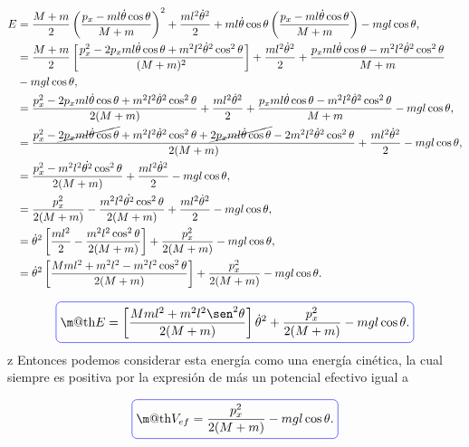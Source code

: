 \documentclass[a4paper,10pt]{article}
\makeatletter
\numberwithin{equation}{section}
\newcommand*{\boxcolor}{blue}
\renewcommand{\boxed}[1]{\textcolor{\boxcolor}{%
\tikz[baseline={([yshift=-1ex]current bounding box.center)}] \node [rectangle, minimum width=1ex,rounded corners,draw] {\normalcolor\m@th$\displaystyle#1$};}}
\makeatother
\begin{document}
\begin{align*}
 E &= \frac{M+m}{2}\left(\frac{p_x - ml\dot{\theta}\cos{\theta}}{M+m}\right)^2 + 
 \frac{ml^2 \dot{\theta}^2}{2} + ml\dot{\theta}\cos{\theta}\left(\frac{p_x - ml\dot{\theta}\cos{\theta}}{M+m}\right)
 - mgl\cos{\theta}, \\
   &= \frac{M+m}{2}\left[ \frac{p_x^2 - 2 p_x ml \dot{\theta}\cos{\theta}+ m^2l^2 \dot{\theta}^2 \cos^2{\theta}}{(M+m)^2} \right]
   + \frac{ml^2 \dot{\theta}^2}{2} + \frac{p_xml\dot{\theta}\cos{\theta - m^2l^2\dot{\theta}^2\cos^2{\theta}}}{M+m} \\
   &- mgl\cos{\theta}, \\
 &= \frac{p_x^2 - 2 p_x ml \dot{\theta}\cos{\theta}+ m^2 l^2 \dot{\theta}^2 \cos^2{\theta}}{2(M+m)}
 + \frac{ml^2 \dot{\theta}^2}{2} + \frac{p_xml\dot{\theta}\cos{\theta} - m^2l^2\dot{\theta}^2\cos^2{\theta}}{M+m}
   - mgl\cos{\theta}, \\
 &= \frac{p_x^2 - \cancel{ 2 p_x ml \dot{\theta}\cos{\theta}}+ m^2 l^2 \dot{\theta}^2 \cos^2{\theta} 
 + \cancel{2p_xml\dot{\theta}\cos{\theta}} -2 m^2l^2\dot{\theta}^2\cos^2{\theta}}{2(M+m)}
  + \frac{ml^2 \dot{\theta}^2}{2} - mgl\cos{\theta}, \\
 &= \frac{p_x^2 - m^2 l^2 \dot{\theta^2} \cos^2{\theta}}{2(M+m)}  + \frac{ml^2 \dot{\theta}^2}{2} - mgl\cos{\theta}, \\
 &= \frac{p_x^2}{2(M+m)} - \frac{ m^2 l^2 \dot{\theta^2} \cos^2{\theta}}{2(M+m)} + \frac{ml^2 \dot{\theta}^2}{2} 
 - mgl\cos{\theta}, \\
 &= \dot{\theta}^2 \left[\frac{ml^2}{2} -  \frac{ m^2 l^2 \cos^2{\theta}}{2(M+m)}\right] 
 + \frac{p_x^2}{2(M+m)} - mgl\cos{\theta},  \\
 &= \dot{\theta}^2\left[ \frac{Mml^2 + m^2 l^2 - m^2l^2\cos^2{\theta}}{2(M+m)} \right]
 + \frac{p_x^2}{2(M+m)} - mgl\cos{\theta}.
\end{align*}

\begin{equation}
 \boxed{E = \left[\frac{Mml^2 + m^2l^2\sen^2{\theta}}{2(M+m)} \right]\dot{\theta}^2 + \frac{p_x^2}{2(M+m)} - mgl\cos{\theta}.}
\label{eq:pendu12}
\end{equation}
z
Entonces podemos considerar esta energía como una energía cinética, la cual siempre 
es positiva por la expresión de  más un potencial efectivo igual a 

\begin{equation}
 \boxed{V_{ef} = \frac{p_x^2}{2(M+m)} - mgl\cos{\theta}.}
\end{equation}
\end{document}
